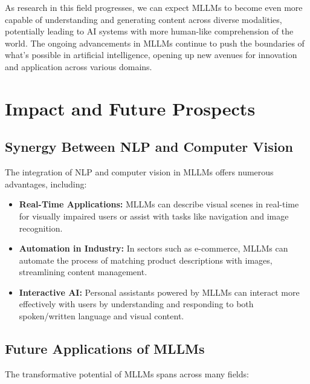As research in this field progresses, we can expect MLLMs to become even more capable of understanding and generating content across diverse modalities, potentially leading to AI systems with more human-like comprehension of the world. The ongoing advancements in MLLMs continue to push the boundaries of what's possible in artificial intelligence, opening up new avenues for innovation and application across various domains.

\section{Impact and Future Prospects}

\subsection{Synergy Between NLP and Computer Vision}

The integration of NLP and computer vision in MLLMs offers numerous advantages, including:

\begin{itemize}
    \item \textbf{Real-Time Applications:} MLLMs can describe visual scenes in real-time for visually impaired users or assist with tasks like navigation and image recognition.
    \item \textbf{Automation in Industry:} In sectors such as e-commerce, MLLMs can automate the process of matching product descriptions with images, streamlining content management.
    \item \textbf{Interactive AI:} Personal assistants powered by MLLMs can interact more effectively with users by understanding and responding to both spoken/written language and visual content.
\end{itemize}

\subsection{Future Applications of MLLMs}

The transformative potential of MLLMs spans across many fields:

